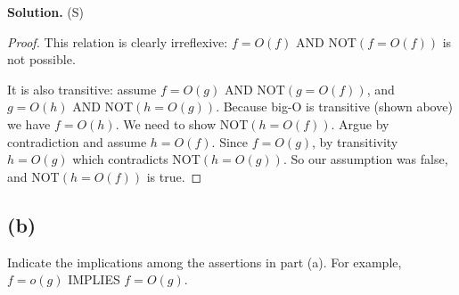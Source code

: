 \documentclass[14pt]{extarticle}
\begin{document}
{\bf Solution.} (S)

\begin{proof}
This relation is clearly irreflexive: $f = O(f)$ AND NOT$(f = O(f))$ is not possible.

It is also transitive: assume $f = O(g)$ AND NOT$(g = O(f))$, and $g = O(h)$ AND NOT$(h = O(g))$. Because big-O is transitive (shown above) we have $f = O(h)$. We need to show NOT$(h = O(f))$. Argue by contradiction and assume $h = O(f)$. Since $f = O(g)$, by transitivity $h = O(g)$ which contradicts NOT$(h = O(g))$. So our assumption was false, and NOT$(h = O(f))$ is true.
\end{proof}

\subsection{(b)}
Indicate the implications among the assertions in part (a). For example, $f = o(g)$ IMPLIES $f = O(g)$.
\end{document}
